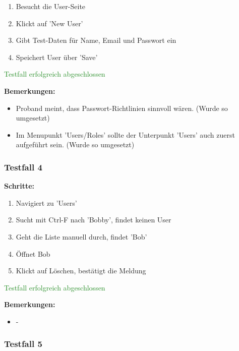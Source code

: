 \begin{enumerate}
    \item Besucht die User-Seite
    \item Klickt auf 'New User'
    \item Gibt Test-Daten für Name, Email und Passwort ein
    \item Speichert User über 'Save'
\end{enumerate}

\textcolor{ForestGreen}{Testfall erfolgreich abgeschlossen}

\bigskip
\textbf{Bemerkungen:}

\begin{itemize}[noitemsep,nolistsep]
    \item Proband meint, dass Passwort-Richtlinien sinnvoll wären. (Wurde so umgesetzt)
    \item Im Menupunkt 'Users/Roles' sollte der Unterpunkt 'Users' auch zuerst aufgeführt sein. (Wurde so umgesetzt)
\end{itemize}


\subsubsection*{Testfall 4}

\textbf{Schritte:}

\begin{enumerate}
    \item Navigiert zu 'Users'
    \item Sucht mit Ctrl-F nach 'Bobby', findet keinen User
    \item Geht die Liste manuell durch, findet 'Bob'
    \item Öffnet Bob
    \item Klickt auf Löschen, bestätigt die Meldung
\end{enumerate}

\textcolor{ForestGreen}{Testfall erfolgreich abgeschlossen}

\bigskip
\textbf{Bemerkungen:}

\begin{itemize}[noitemsep,nolistsep]
    \item -
\end{itemize}

\subsubsection*{Testfall 5}

